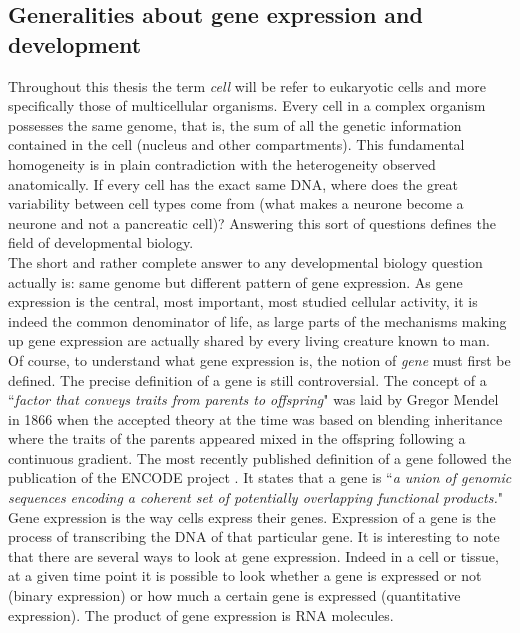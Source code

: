      \subsection{Generalities about gene expression and development}  
     Throughout this thesis the term \emph{cell} will be refer to eukaryotic cells and more specifically those of multicellular organisms. Every cell in a complex organism possesses the same genome, that is, the sum of all the genetic information contained in the cell (nucleus and other compartments). This fundamental homogeneity is in plain contradiction with the heterogeneity observed anatomically. If every cell has the exact same DNA, where does the great variability between cell types come from (what makes a neurone become a neurone and not a pancreatic cell)? Answering this sort of questions defines the field of developmental biology.\\
     
     The short and rather complete answer to any developmental biology question actually is: same genome but different pattern of gene expression. As gene expression is the central, most important, most studied cellular activity, it is indeed the common denominator of life, as large parts of the mechanisms making up gene expression are actually shared by every living creature known to man.\\

     Of course, to understand what gene expression is, the notion of \emph{gene} must first be defined. The precise definition of a gene is still controversial. The concept of a ``\emph{factor that conveys traits from parents to offspring}" was laid by Gregor Mendel in 1866 \cite{mendel66} when the accepted theory at the time was based on blending inheritance where the traits of the parents appeared mixed in the offspring following a continuous gradient. The most recently published definition of a gene followed the publication of the ENCODE project \cite{feingold04}. It states that a gene is ``\emph{a union of genomic sequences encoding a coherent set of potentially overlapping functional products.}"\\

	Gene expression is the way cells express their genes. Expression of a gene is the process of transcribing the DNA of that particular gene. It is interesting to note that there are several ways to look at gene expression. Indeed in a cell or tissue, at a given time point it is possible to look whether a gene is expressed or not (binary expression) or how much a certain gene is expressed (quantitative expression). The product of gene expression is RNA molecules.\\
	
